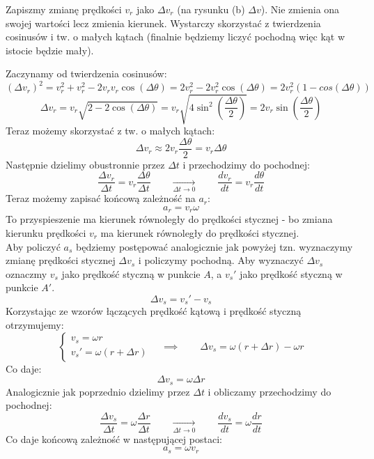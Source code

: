 \documentclass[a4paper]{article}
\begin{document}
    \noindent Zapiszmy zmianę prędkości $v_r$ jako $\Delta v_r$ (na rysunku (b) $\Delta v$).
    Nie zmienia ona swojej wartości lecz zmienia kierunek. Wystarczy skorzystać z twierdzenia
    cosinusów i tw. o małych kątach (finalnie będziemy liczyć pochodną więc kąt w istocie będzie
    mały).

    \noindent Zaczynamy od twierdzenia cosinusów:
    \[(\Delta v_r)^2 = v_r^2 + v_r^2 - 2v_rv_r\cos(\Delta \theta) = 2v_r^2 - 2v_r^2\cos(\Delta \theta)
    = 2v_r^2(1 - cos(\Delta \theta))\]
    \[\Delta v_r = v_r\sqrt{2-2\cos(\Delta\theta)} = v_r\sqrt{4\sin^2\left(\frac{\Delta\theta}{2}\right)} = 2v_r\sin\left(\frac{\Delta\theta}{2}\right)\]
    Teraz możemy skorzystać z tw. o małych kątach:
    \[\Delta v_r \approx 2v_r\frac{\Delta \theta}{2} = v_r\Delta\theta \]
    Następnie dzielimy obustronnie przez $\Delta t$ i przechodzimy do pochodnej:
    \[\frac{\Delta v_r}{\Delta t} = v_r \frac{\Delta\theta}{\Delta t} \qquad\xrightarrow[\Delta t\to 0]{} 
    \qquad \frac{dv_r}{dt} = v_r\frac{d\theta}{dt}\]
    Teraz możemy zapisać końcową zależność na $a_r$:
    \[a_r = v_r\omega\]
    To przyspieszenie ma kierunek równoległy do prędkości stycznej - bo zmiana kierunku prędkości $v_r$
    ma kierunek równoległy do prędkości stycznej.\\

    \noindent Aby policzyć $a_s$ będziemy postępować analogicznie jak powyżej tzn. wyznaczymy zmianę
    prędkości stycznej $\Delta v_s$ i policzymy pochodną.
    Aby wyznaczyć $\Delta v_s$ oznaczmy $v_s$ jako prędkość styczną w punkcie $A$, a $v_s'$ jako
    prędkość styczną w punkcie $A'$.
    \[\Delta v_s = v_s' - v_s\]
    Korzystając ze wzorów łączących prędkość kątową i prędkość styczną otrzymujemy:
    \[
        \begin{cases}
            v_s = \omega r \\
            v_s' = \omega (r + \Delta r)
        \end{cases} \quad \implies \qquad \Delta v_s = \omega (r + \Delta r) - \omega r\]
    Co daje:
    \[\Delta v_s = \omega \Delta r\]
    Analogicznie jak poprzednio dzielimy przez $\Delta t$ i obliczamy przechodzimy do pochodnej:
    \[\frac{\Delta v_s}{\Delta t} = \omega \frac{\Delta r}{\Delta t} \qquad\xrightarrow[\Delta t\to 0]{} 
    \qquad \frac{dv_s}{dt} = \omega\frac{dr}{dt}\]
    Co daje końcową zależność w następującej postaci:
    \[a_s = \omega v_r\]
\end{document}
